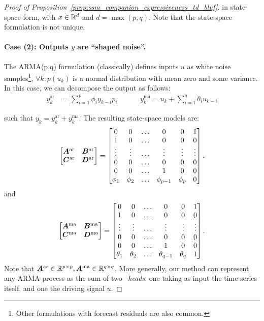 \begin{proof}[Proof of Proposition~\ref{prop:ssm_companion_expressiveness_td_bluf}]
in state-space form, with $x\in\mathbb{R}^{d}$ and $d = \max(p, q)$. Note that the state-space formulation is not unique.

\paragraph{Case (2): Outputs $y$ are ``shaped noise''.}
%
The ARMA(p,q) formulation (classically) defines inputs $u$ as white noise samples\footnote{Other formulations with forecast residuals are also common.}, $\forall k: p(u_k)$ is a normal distribution with mean zero and some variance. In this case, we can decompose the output as follows:
%
\[
\begin{aligned}
    y^{\text{ar}}_k &= \sum_{i=1}^p \phi_i y_{k-i} p_i &&&& y^{\text{ma}}_k = u_k + \sum_{i=1}^q \theta_i u_{k-i}
\end{aligned}
\]

such that $y_k =y^{\text{ar}}_k + y^{\text{ma}}_k$. The resulting state-space models are: 
%
\[
%
\begin{bmatrix}\zA^{\text{ar}} & \zB^{\text{ar}} \\ \zC^{\text{ar}} & \zD^{\text{ar}}\end{bmatrix} = \begin{bmatrix}0 & 0 & \dots & 0 & 0  & 1 \\ 1 & 0 & \dots & 0 & 0 & 0 \\ \vdots & \vdots & \dots & \vdots & \vdots & \vdots \\ 0 & 0 & \dots & 0 & 0 & 0 \\ 0 & 0 & \dots & 1 & 0 & 0 \\ \phi_1 & \phi_2 & \dots & \phi_{p-1} & \phi_p & 0 \end{bmatrix}.
%
\]
and 
%
\[
%
\begin{bmatrix}\zA^{\text{ma}} & \zB^{\text{ma}} \\ \zC^{\text{ma}} & \zD^{\text{ma}}\end{bmatrix} = \begin{bmatrix}0 & 0 & \dots & 0 & 0  & 1 \\ 1 & 0 & \dots & 0 & 0 & 0 \\ \vdots & \vdots & \dots & \vdots & \vdots & \vdots \\ 0 & 0 & \dots & 0 & 0 & 0 \\ 0 & 0 & \dots & 1 & 0 & 0 \\ \theta_1 & \theta_2 & \dots & \theta_{q-1} & \theta_q & 1 \end{bmatrix}.
%
\]
Note that $\boldsymbol{A}^{\text{ar}} \in \mathbb{R}^{p \times p}, \boldsymbol{A}^{\text{ma}} \in \mathbb{R}^{q \times q}$. More generally, our method can represent any ARMA process as the sum of two \ourmethod~\textit{heads}: one taking as input the time series itself, and one the driving signal $u$.
%


\end{proof}
